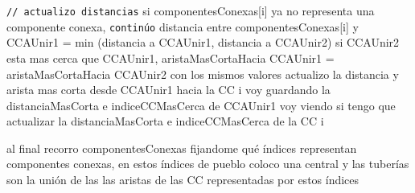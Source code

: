 \documentclass[11pt, a4paper, twoside]{article}
\begin{document}
\begin{algorithm}[H]
\begin{algorithmic}[1]
	\Statex \hspace{0.5cm} \texttt{// actualizo distancias}
	  
		\State si componentesConexas[i] ya no representa una componente conexa, \texttt{continúo}  
		\State distancia entre componentesConexas[i] y CCAUnir1 = min (distancia a CCAUnir1, distancia a CCAUnir2)  
        \State si CCAUnir2 esta mas cerca que CCAUnir1, aristaMasCortaHacia CCAUnir1 = aristaMasCortaHacia CCAUnir2  
        \State con los mismos valores actualizo la distancia y arista mas corta desde CCAUnir1 hacia la CC i  
        \State voy guardando la distanciaMasCorta e indiceCCMasCerca de CCAUnir1  
        \State voy viendo si tengo que actualizar la distanciaMasCorta e indiceCCMasCerca de la CC i  
	\EndFor
\EndFor 

\State al final recorro componentesConexas fijandome qué índices representan componentes conexas, 
	   en estos índices de pueblo coloco una central y las tuberías son la unión de las las aristas 
	   de las CC representadas por estos índices  


	
\end{algorithmic}
\end{algorithm}
\end{document}
